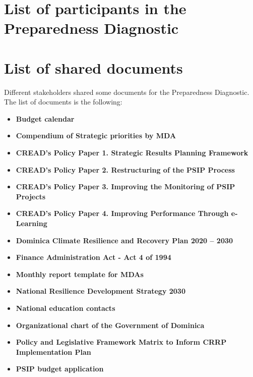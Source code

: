 \documentclass[
]{book}
\begin{document}
\hypertarget{appendixD}{%
\chapter{List of participants in the Preparedness Diagnostic}\label{appendixD}}

\hypertarget{appendixE}{%
\chapter{List of shared documents}\label{appendixE}}

Different stakeholders shared some documents for the Preparedness Diagnostic. The list of documents is the following:

\begin{itemize}
\item
  \textbf{Budget calendar}
\item
  \textbf{Compendium of Strategic priorities by MDA}
\item
  \textbf{CREAD's Policy Paper 1. Strategic Results Planning Framework}
\item
  \textbf{CREAD's Policy Paper 2. Restructuring of the PSIP Process}
\item
  \textbf{CREAD's Policy Paper 3. Improving the Monitoring of PSIP Projects}
\item
  \textbf{CREAD's Policy Paper 4. Improving Performance Through e-Learning}
\item
  \textbf{Dominica Climate Resilience and Recovery Plan 2020 -- 2030}
\item
  \textbf{Finance Administration Act - Act 4 of 1994}
\item
  \textbf{Monthly report template for MDAs}
\item
  \textbf{National Resilience Development Strategy 2030}
\item
  \textbf{National education contacts}
\item
  \textbf{Organizational chart of the Government of Dominica}
\item
  \textbf{Policy and Legislative Framework Matrix to Inform CRRP Implementation Plan}
\item
  \textbf{PSIP budget application}
\end{itemize}

  
\end{document}
